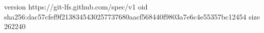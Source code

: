 version https://git-lfs.github.com/spec/v1
oid sha256:dac57cfef9f2138345430257737680aacf568440f9803a7e6c4e55357bc12454
size 262240
